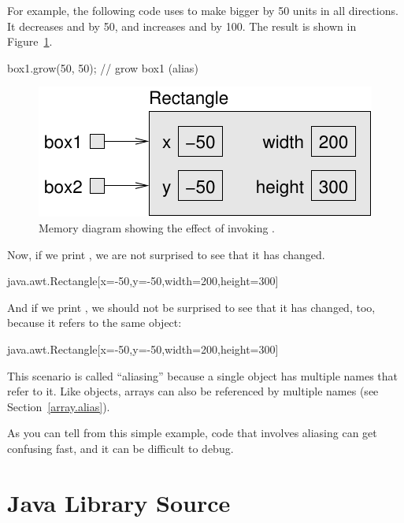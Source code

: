 For example, the following code uses  to make  bigger by 50 units in all directions.
It decreases  and  by 50, and increases  and  by 100.
The result is shown in Figure~\ref{fig.aliasing2}.

\begin{code}
box1.grow(50, 50);                // grow box1 (alias)
\end{code}

\begin{figure}[!ht]
\begin{center}
\includegraphics{figs/aliasing2.pdf}
\caption{Memory diagram showing the effect of invoking .}
\label{fig.aliasing2}
\end{center}
\end{figure}

Now, if we print , we are not surprised to see that it has changed.

\begin{code}
java.awt.Rectangle[x=-50,y=-50,width=200,height=300]
\end{code}

And if we print , we should not be surprised to see that it has changed, too, because it refers to the same object:

\begin{code}
java.awt.Rectangle[x=-50,y=-50,width=200,height=300]
\end{code}


This scenario is called ``aliasing'' because a single object has multiple names that refer to it.
Like objects, arrays can also be referenced by multiple names (see Section~\ref{array.alias}).

As you can tell from this simple example, code that involves aliasing can get confusing fast, and it can be difficult to debug.


\section{Java Library Source}
\label{src.zip}

